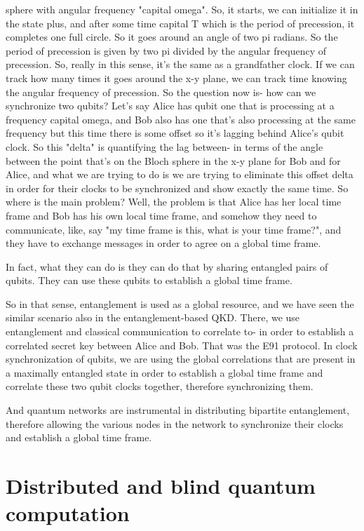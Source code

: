sphere with angular frequency "capital omega". So, it starts, we can initialize it in the state plus, and after some time capital T which is the period of precession, it completes one full circle. So it goes around an angle of two pi radians. So the period of precession is given by two pi divided by the angular frequency of precession. So, really in this sense, it's the same as a grandfather clock. If we can track how many times it goes around the x-y plane, we can track time knowing the angular frequency of precession. So the question now is- how can we synchronize two qubits? Let's say Alice has qubit one that is processing at a frequency capital omega, and Bob also has one that's also processing at the same frequency but this time there is some offset so it's lagging behind Alice's qubit clock. So this "delta" is quantifying the lag between- in terms of the angle between the point that's on the Bloch sphere in the x-y plane for Bob and for Alice, and what we are trying to do is we are trying to eliminate this offset delta in order for their clocks to be synchronized and show exactly the same time. So where is the main problem? Well, the problem is that Alice has her local time frame and Bob has his own local time frame, and somehow they need to communicate, like, say "my time frame is this, what is your time frame?", and they have to exchange messages in order to agree on a global time frame.

In fact, what they can do is they can do that by sharing entangled pairs of qubits. They can use these qubits to establish a global time frame.

So in that sense, entanglement is used as a global resource, and we have seen the similar scenario also in the entanglement-based QKD. There, we use entanglement and classical communication to correlate to- in order to establish a correlated secret key between Alice and Bob. That was the E91 protocol. In clock synchronization of qubits, we are using the global correlations that are present in a maximally entangled state in order to establish a global time frame and correlate these two qubit clocks together, therefore synchronizing them.

And quantum networks are instrumental in distributing bipartite entanglement, therefore allowing the various nodes in the network to synchronize their clocks and establish a global time frame.



\section{Distributed and blind quantum computation}

